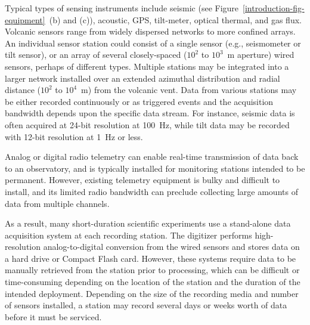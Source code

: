\vfill\eject

Typical types of sensing instruments include seismic (see
Figure~\ref{introduction-fig-equipment}~(b) and (c)), acoustic, GPS,
tilt-meter, optical thermal, and gas flux. Volcanic sensors range from widely
dispersed networks to more confined arrays. An individual sensor station
could consist of a single sensor (e.g., seismometer or tilt sensor), or an
array of several closely-spaced ($10^2$ to $10^3$~m aperture) wired sensors,
perhaps of different types. Multiple stations may be integrated into a larger
network installed over an extended azimuthal distribution and radial distance
($10^2$ to $10^4$~m) from the volcanic vent. Data from various stations may
be either recorded continuously or as triggered events and the acquisition
bandwidth depends upon the specific data stream. For instance, seismic data
is often acquired at 24-bit resolution at 100~Hz, while tilt data may be
recorded with 12-bit resolution at 1~Hz or less.

Analog or digital radio telemetry can enable real-time transmission of data
back to an observatory, and is typically installed for monitoring stations
intended to be permanent. However, existing telemetry equipment is bulky and
difficult to install, and its limited radio bandwidth can preclude collecting
large amounts of data from multiple channels.

As a result, many short-duration scientific experiments use a stand-alone
data acquisition system at each recording station. The digitizer performs
high-resolution analog-to-digital conversion from the wired sensors and
stores data on a hard drive or Compact Flash card. However, these systems
require data to be manually retrieved from the station prior to processing,
which can be difficult or time-consuming depending on the location of the
station and the duration of the intended deployment. Depending on the size of
the recording media and number of sensors installed, a station may record
several days or weeks worth of data before it must be serviced.

\vfill\eject

